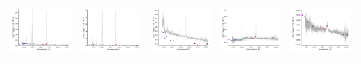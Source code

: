 \begin{center}
\begin{longtable}{l l l l l }
    \includegraphics[width=0.2\linewidth, clip]{Figs/Figs-sdss/spec-0330-52370-0144-SPLUS-n03s21-009182.pdf} & \includegraphics[width=0.2\linewidth, clip]{Figs/Figs-sdss/spec-0376-52143-0160-STRIPE82-0139-046699.pdf} & \includegraphics[width=0.2\linewidth, clip]{Figs/Figs-sdss/spec-0376-52143-0631-STRIPE82-0142-027354.pdf} & \includegraphics[width=0.2\linewidth, clip]{Figs/Figs-sdss/spec-0377-52145-0294-STRIPE82-0141-019376.pdf} & \includegraphics[width=0.2\linewidth, clip]{Figs/Figs-sdss/spec-0377-52145-0484-STRIPE82-0142-017985.pdf} \\

\end{longtable}
\end{center}
